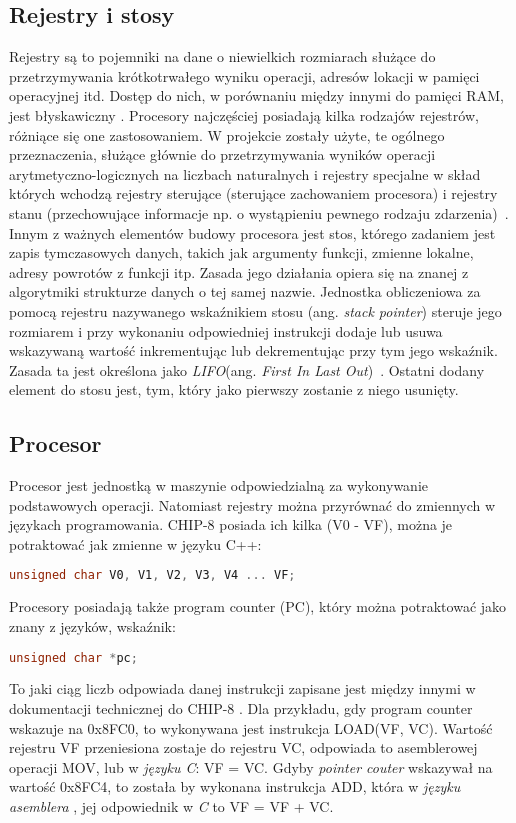 \subsection{Rejestry i stosy}
Rejestry są to pojemniki na dane o niewielkich rozmiarach służące do przetrzymywania krótkotrwałego wyniku operacji, adresów lokacji w pamięci operacyjnej itd. Dostęp do nich, w porównaniu między innymi do pamięci RAM, jest błyskawiczny \cite{Coldwin}. Procesory najczęściej posiadają kilka rodzajów rejestrów, różniące się one zastosowaniem. W projekcie zostały użyte, te ogólnego przeznaczenia, służące głównie do przetrzymywania wyników operacji arytmetyczno-logicznych na liczbach naturalnych i rejestry specjalne w skład których wchodzą rejestry sterujące (sterujące zachowaniem procesora) i rejestry stanu (przechowujące informacje np. o wystąpieniu pewnego rodzaju zdarzenia)~\cite{Coldwin}. \\

Innym z ważnych elementów budowy procesora jest stos, którego zadaniem jest  zapis tymczasowych danych, takich jak argumenty funkcji, zmienne lokalne, adresy powrotów z funkcji itp. Zasada jego działania opiera się na znanej z algorytmiki strukturze danych o tej samej nazwie. Jednostka obliczeniowa za pomocą rejestru nazywanego wskaźnikiem stosu (ang. \textit{stack pointer}) \cite{Coldwin} steruje jego rozmiarem i przy  wykonaniu odpowiedniej instrukcji dodaje lub usuwa wskazywaną wartość inkrementując lub dekrementując przy tym jego wskaźnik. Zasada ta jest określona jako \textit{LIFO}(ang. \textit{First In Last Out})~\cite{Cormen}. Ostatni dodany element do stosu jest, tym, który jako pierwszy zostanie z niego usunięty.

\subsection{Procesor}
Procesor jest jednostką w maszynie odpowiedzialną za wykonywanie podstawowych operacji. Natomiast rejestry można przyrównać do zmiennych w językach programowania. CHIP-8 posiada ich kilka (V0 - VF), można je potraktować
jak zmienne w języku C++:
\begin{lstlisting}[language=c]
unsigned char V0, V1, V2, V3, V4 ... VF;
\end{lstlisting}
Procesory posiadają także program counter (PC), który można potraktować jako znany z języków, wskaźnik:
\begin{lstlisting}[language=c]
unsigned char *pc;
\end{lstlisting}
To jaki ciąg liczb odpowiada danej instrukcji zapisane jest między innymi w dokumentacji technicznej do CHIP-8 \cite{Cowgod}. Dla przykładu, gdy program counter wskazuje na 0x8FC0, to wykonywana jest instrukcja LOAD(VF, VC). Wartość rejestru VF przeniesiona zostaje do rejestru VC, odpowiada to asemblerowej operacji MOV, lub w \textit{języku C}: VF = VC. Gdyby \textit{pointer couter} wskazywał na wartość 0x8FC4, to została by wykonana instrukcja ADD, która w \textit{języku asemblera} , jej odpowiednik w \textit{C} to VF = VF + VC. \\

